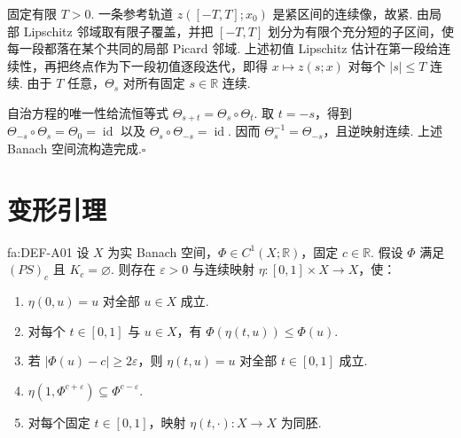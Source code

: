 \begin{FAProof}
固定有限 \(\displaystyle T>0\). 一条参考轨道 \(\displaystyle z([-T,T];x_0)\) 是紧区间的连续像，故紧. 由局部 Lipschitz 邻域取有限子覆盖，并把 \(\displaystyle[-T,T]\) 划分为有限个充分短的子区间，使每一段都落在某个共同的局部 Picard 邻域. 上述初值 Lipschitz 估计在第一段给连续性，再把终点作为下一段初值逐段迭代，即得 \(\displaystyle x\mapsto z(s;x)\) 对每个 \(\displaystyle|s|\leqslant T\) 连续. 由于 \(\displaystyle T\) 任意，\(\displaystyle\Theta_s\) 对所有固定 \(\displaystyle s\in\mathbb R\) 连续.

自治方程的唯一性给流恒等式 \(\displaystyle\Theta_{s+t}=\Theta_s\circ\Theta_t\). 取 \(\displaystyle t=-s\)，得到 \(\displaystyle\Theta_{-s}\circ\Theta_s=\Theta_0=\operatorname{id}\) 以及 \(\displaystyle\Theta_s\circ\Theta_{-s}=\operatorname{id}\). 因而 \(\displaystyle\Theta_s^{-1}=\Theta_{-s}\)，且逆映射连续. 上述 Banach 空间流构造完成.\hfill\(\square\)
\end{FAProof}

\section{变形引理}\label{sec:iii09-deformation}

\begin{FATheorem}[A][定量变形引理]{fa:DEF-A01}
设 \(\displaystyle X\) 为实 Banach 空间，\(\displaystyle\Phi\in C^1(X;\mathbb R)\)，固定 \(\displaystyle c\in\mathbb R\). 假设 \(\displaystyle\Phi\) 满足 \(\displaystyle(PS)_c\) 且 \(\displaystyle K_c=\varnothing\). 则存在 \(\displaystyle\varepsilon>0\) 与连续映射 \(\displaystyle\eta:[0,1]\times X\to X\)，使：
\begin{enumerate}
\item \(\displaystyle\eta(0,u)=u\) 对全部 \(\displaystyle u\in X\) 成立.
\item 对每个 \(\displaystyle t\in[0,1]\) 与 \(\displaystyle u\in X\)，有 \(\displaystyle\Phi(\eta(t,u))\leqslant\Phi(u)\).
\item 若 \(\displaystyle|\Phi(u)-c|\geqslant2\varepsilon\)，则 \(\displaystyle\eta(t,u)=u\) 对全部 \(\displaystyle t\in[0,1]\) 成立.
\item \(\displaystyle\eta(1,\Phi^{c+\varepsilon})\subseteq\Phi^{c-\varepsilon}\).
\item 对每个固定 \(\displaystyle t\in[0,1]\)，映射 \(\displaystyle\eta(t,\cdot):X\to X\) 为同胚.
\end{enumerate}
\end{FATheorem}

